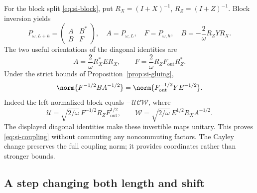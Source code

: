 For the block split \eqref{eq:si-block}, put
$R_X=(I+X)^{-1}$, $R_Z=(I+Z)^{-1}$. Block inversion yields
\begin{equation}
 P_{\omega,L+h}=\begin{pmatrix}A&B^*\\B&F\end{pmatrix},
 \quad A=P_{\omega,L},\quad F=P_{\omega,h},\quad
 B=-\frac2\omega R_ZYR_X.
\end{equation}
The two useful orientations of the diagonal identities are
\begin{equation}
 A=\frac2\omega R_X^*ER_X,\qquad
 F=\frac2\omega R_ZF_{\mathrm{out}}R_Z^*.
\end{equation}
Under the strict bounds of Proposition~\ref{prop:si-gluing},
\begin{equation}\label{eq:si-coupling}
 \norm{F^{-1/2}BA^{-1/2}}
 =\norm{F_{\mathrm{out}}^{-1/2}YE^{-1/2}}.
\end{equation}
Indeed the left normalized block equals $-\mathcal U\mathcal C\mathcal W$,
where
\[
 \mathcal U=\sqrt{2/\omega}\,F^{-1/2}R_ZF_{\mathrm{out}}^{1/2},
 \qquad
 \mathcal W=\sqrt{2/\omega}\,E^{1/2}R_XA^{-1/2}.
\]
The displayed diagonal identities make these invertible maps
unitary. This proves \eqref{eq:si-coupling} without commuting any
noncommuting factors. The Cayley change preserves the full
coupling norm; it provides coordinates rather than stronger bounds.

\subsection{A step changing both length and shift}

